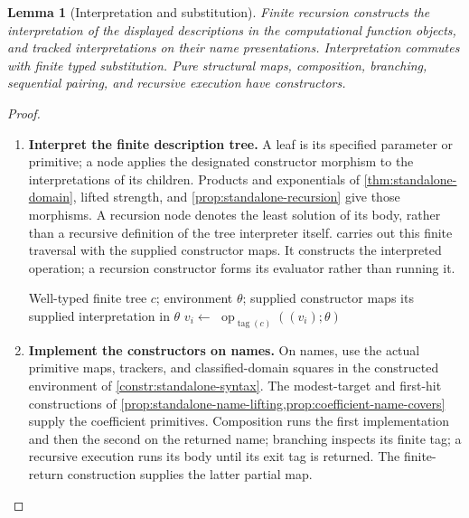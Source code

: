 \documentclass[11pt,a4paper]{article}
\numberwithin{algorithm}{section}
\numberwithin{equation}{section}
\newtheorem{lemma}[lemma]{Lemma}
\theoremstyle{definition}
\theoremstyle{remark}
\theoremstyle{plain}
\theoremstyle{definition}
\theoremstyle{plain}
\begin{document}
\begin{lemma}[Interpretation and substitution]\label{lem:standalone-syntax}
Finite recursion constructs the interpretation of the displayed
descriptions in the computational function objects, and tracked
interpretations on their name presentations. Interpretation
commutes with finite typed substitution. Pure structural maps,
composition, branching, sequential pairing, and recursive execution
have constructors.
\end{lemma}
\begin{proof}\leavevmode
\begin{enumerate}[leftmargin=*,align=left]
\item \textbf{Interpret the finite description tree.}
A leaf is its specified parameter or primitive; a node applies
the designated constructor morphism to the interpretations of
its children. Products and exponentials of
\cref{thm:standalone-domain}, lifted strength, and
\cref{prop:standalone-recursion} give those morphisms.
A recursion node denotes the least solution of its body, rather
than a recursive definition of the tree interpreter itself.
 carries out this finite traversal with
the supplied constructor maps. It constructs the interpreted operation;
a recursion constructor forms its evaluator rather than running it.
\begin{algorithm}[H]
\caption{Interpretation of a finite typed description}\label{alg:interpret-tree}
\small
\begin{algorithmic}[1]
\Require Well-typed finite tree $c$; environment $\theta$; supplied constructor maps
    \State \Return its supplied interpretation in $\theta$
  \Else
      \State $v_i\gets{}$ 
    \EndFor
    \State \Return $\operatorname{op}_{\operatorname{tag}(c)}((v_i);\theta)$
  \EndIf
\EndProcedure
\end{algorithmic}
\end{algorithm}

\item \textbf{Implement the constructors on names.}
On names, use the actual primitive maps, trackers, and
classified-domain squares in the constructed environment of
\cref{constr:standalone-syntax}. The modest-target and first-hit
constructions of \cref{prop:standalone-name-lifting,prop:coefficient-name-covers}
supply the coefficient primitives. Composition runs the first
implementation and then the second on the returned name;
branching inspects its finite tag; a recursive execution runs
its body until its exit tag is returned. The finite-return
construction supplies the latter partial map.


\end{enumerate}
\end{proof}
\end{document}
